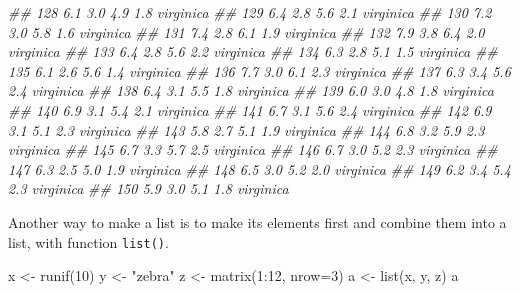 \documentclass[
  13,
  letterpaper,
]{report}
\newenvironment{Shaded}{\begin{snugshade}}{\end{snugshade}}
\newcommand{\AttributeTok}[1]{\textcolor[rgb]{0.40,0.45,0.13}{#1}}
\newcommand{\DecValTok}[1]{\textcolor[rgb]{0.68,0.00,0.00}{#1}}
\newcommand{\DocumentationTok}[1]{\textcolor[rgb]{0.37,0.37,0.37}{\textit{#1}}}
\newcommand{\FunctionTok}[1]{\textcolor[rgb]{0.28,0.35,0.67}{#1}}
\newcommand{\NormalTok}[1]{\textcolor[rgb]{0.00,0.23,0.31}{#1}}
\newcommand{\OtherTok}[1]{\textcolor[rgb]{0.00,0.23,0.31}{#1}}
\newcommand{\SpecialCharTok}[1]{\textcolor[rgb]{0.37,0.37,0.37}{#1}}
\newcommand{\StringTok}[1]{\textcolor[rgb]{0.13,0.47,0.30}{#1}}
\begin{document}
\begin{Shaded}
\begin{Highlighting}[]
\DocumentationTok{\#\# 128          6.1         3.0          4.9         1.8  virginica}
\DocumentationTok{\#\# 129          6.4         2.8          5.6         2.1  virginica}
\DocumentationTok{\#\# 130          7.2         3.0          5.8         1.6  virginica}
\DocumentationTok{\#\# 131          7.4         2.8          6.1         1.9  virginica}
\DocumentationTok{\#\# 132          7.9         3.8          6.4         2.0  virginica}
\DocumentationTok{\#\# 133          6.4         2.8          5.6         2.2  virginica}
\DocumentationTok{\#\# 134          6.3         2.8          5.1         1.5  virginica}
\DocumentationTok{\#\# 135          6.1         2.6          5.6         1.4  virginica}
\DocumentationTok{\#\# 136          7.7         3.0          6.1         2.3  virginica}
\DocumentationTok{\#\# 137          6.3         3.4          5.6         2.4  virginica}
\DocumentationTok{\#\# 138          6.4         3.1          5.5         1.8  virginica}
\DocumentationTok{\#\# 139          6.0         3.0          4.8         1.8  virginica}
\DocumentationTok{\#\# 140          6.9         3.1          5.4         2.1  virginica}
\DocumentationTok{\#\# 141          6.7         3.1          5.6         2.4  virginica}
\DocumentationTok{\#\# 142          6.9         3.1          5.1         2.3  virginica}
\DocumentationTok{\#\# 143          5.8         2.7          5.1         1.9  virginica}
\DocumentationTok{\#\# 144          6.8         3.2          5.9         2.3  virginica}
\DocumentationTok{\#\# 145          6.7         3.3          5.7         2.5  virginica}
\DocumentationTok{\#\# 146          6.7         3.0          5.2         2.3  virginica}
\DocumentationTok{\#\# 147          6.3         2.5          5.0         1.9  virginica}
\DocumentationTok{\#\# 148          6.5         3.0          5.2         2.0  virginica}
\DocumentationTok{\#\# 149          6.2         3.4          5.4         2.3  virginica}
\DocumentationTok{\#\# 150          5.9         3.0          5.1         1.8  virginica}
\end{Highlighting}
\end{Shaded}

Another way to make a list is to make its elements first and combine
them into a list, with function \texttt{list()}.

\begin{Shaded}
\begin{Highlighting}[]
\NormalTok{x }\OtherTok{\textless{}{-}} \FunctionTok{runif}\NormalTok{(}\DecValTok{10}\NormalTok{)}
\NormalTok{y }\OtherTok{\textless{}{-}} \StringTok{"zebra"}
\NormalTok{z }\OtherTok{\textless{}{-}} \FunctionTok{matrix}\NormalTok{(}\DecValTok{1}\SpecialCharTok{:}\DecValTok{12}\NormalTok{, }\AttributeTok{nrow=}\DecValTok{3}\NormalTok{)}
\NormalTok{a }\OtherTok{\textless{}{-}} \FunctionTok{list}\NormalTok{(x, y, z)}
\NormalTok{a}
\end{Highlighting}
\end{Shaded}
\end{document}
